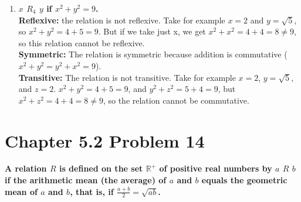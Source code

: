 \documentclass[10pt]{article}
\begin{document}
\begin{enumerate}[label=(\alph*)]
    \item \textbf{$x$ $R_4$ $y$ if $x^2 + y^2 = 9$.} \\
        \textbf{Reflexive:} the relation is not reflexive.  Take for example $x = 2$ and $y = \sqrt5$, so $x^2 + y^2 = 4 + 5 = 9$.  But if we take just x,
        we get $x^2 + x^2 = 4 + 4 = 8 \not= 9$, so this relation cannot be reflexive. \\
        \textbf{Symmetric:} The relation is symmetric because addition is commutative ($x^2 + y^2 = y^2 + x^2 = 9$). \\
        \textbf{Transitive:} The relation is not transitive.  Take for example $x = 2$, $y = \sqrt5$, and $z = 2$.  $x^2 + y^2 = 4 + 5 = 9$, and 
        $y^2 + z^2 = 5 + 4 = 9$, but $x^2 + z^2 = 4 + 4 = 8 \not= 9$, so the relation cannot be commutative.

\end{enumerate}



\section{Chapter 5.2 Problem 14}
\textbf{A relation $R$ is defined on the set $\mathbb{R}^+$ of positive real numbers by $a$ $R$ $b$ if the arithmetic mean
(the average) of $a$ and $b$ equals the geometric mean of $a$ and $b$, that is, if $\frac{a + b}2 = \sqrt{ab}$.}
\end{document}
